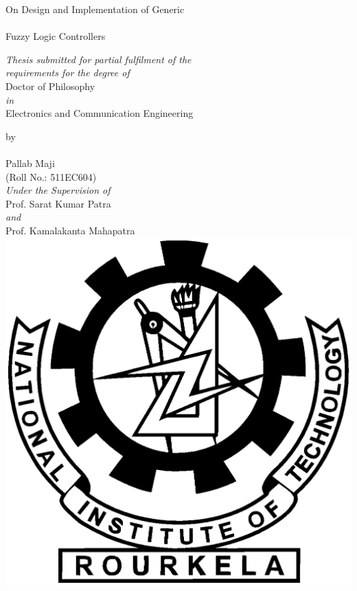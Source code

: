 \begin{titlepage}
\begin{center}

{\LARGE {On Design and Implementation of Generic \\\tiny~\\ \LARGE Fuzzy Logic Controllers}}
\par
\vspace{.4in}
\small{\textit{Thesis submitted for partial fulfilment of the\\requirements for the degree of}\\ \vspace{0.2in} \large{Doctor of Philosophy}}
\\\textit{in}\\\large Electronics and Communication Engineering\\
\par
{\small by\\~\\\Large Pallab Maji\\\small (Roll No.: 511EC604)}
\vspace{0.2in}
\\
\small \textit{Under the Supervision of} \\
	\vspace{0.1in}
	\large Prof. Sarat Kumar Patra \\ 
	\small \textit{and} \\
	\large Prof. Kamalakanta Mahapatra \\
	\vspace{0.9in}
\includegraphics[scale=0.3]{logo}\\[0.1in]
\par



\end{center}
\end{titlepage}
